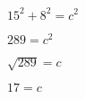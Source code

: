 \documentclass[a4paper]{article}
\begin{document}
\begin{comment}
\section*{Spragos pagal D. Tall.}

\textbf{Spragos pavyzdys.} 

Dešimtmetis Haris sunkiai atlikdavo matematines procedūras, todėl mokėsi matematikos papidomai. Iš pradžių jam buvo sunku atlikti daugybą stulpeliu, tačiau laikui bėgant palengvėjo. Tačiau atsirado sunkumų dirbant su dešimtainėmis trupmenomis. Hario atsakymai: 
\begin{itemize}
\item Kiek bus 12,5\$? - 12 dolerių ir 5 centai.
\item Kiek bus pusė? - 0,5.
\item Kiek bus trečdalis? - 0,1 (pagal spėjimą.)
\end{itemize}

\textbf{Spragos priežastys.}
Nesuprantama kablelio ir skaičių skyrių prasmė

\textbf{Kaip pašalinti spragą} 

Naudoti mokomąją priemonę - stumdomas juosteles, kurios padeda išskaidyti skaičių pagal skyrius ir atikti daugybą bei dalybą iš 10. Rezultatas: po kelių minučių stumdant juosteles su tik vienu skaitmeniu gale Hariui paaiškėjo, kad 0,5 reiškia 5 dešimtąsiais. Jis apsidžiaugė, ka suprato, jog 0,1 yra viena dešimtoji. Po to pavyko išsiaiškinti skaičių 0,5, 0,50 ir 0,05 panašumus ir skirtumus. Laikui bėgant žinios susikompresavo: jam nereikėjo juostelių, užteko skyrius keisti mintyse.
\end{comment}
$15^2+8^2=c^2$

$289=c^2$

$\sqrt{289}=c$

$17=c$
\end{document}

